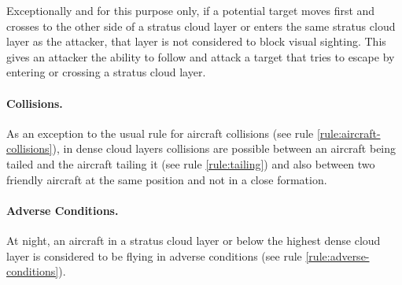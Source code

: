 \begin{advancedrules}
{Exceptionally and for this purpose only, if a potential target moves first and crosses to the other side of a stratus cloud layer or enters the same stratus cloud layer as the attacker, that layer is not considered to block visual sighting. This gives an attacker the ability to follow and attack a target that tries to escape by entering or crossing a stratus cloud layer.

\paragraph{Collisions.} As an exception to the usual rule for aircraft collisions (see rule \ref{rule:aircraft-collisions}), in dense cloud layers collisions are possible between an aircraft being tailed and the aircraft tailing it (see rule \ref{rule:tailing}) and also between two friendly aircraft at the same position and not in a close formation.

\paragraph{Adverse Conditions.} At night, an aircraft in a stratus cloud layer or below the highest dense cloud layer is considered to be flying in adverse conditions (see rule \ref{rule:adverse-conditions}).

}

\end{advancedrules}
